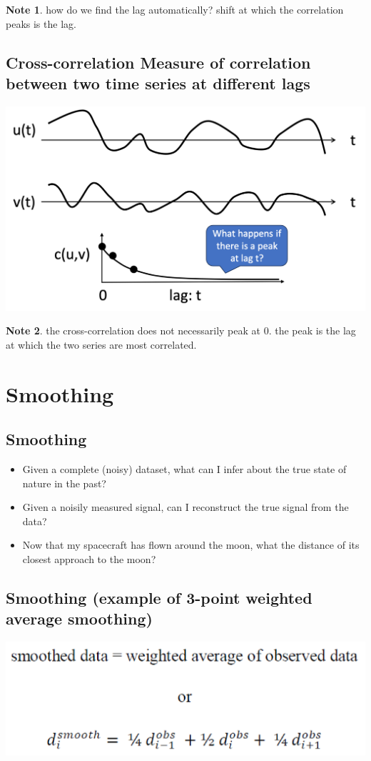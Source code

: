 \documentclass[11pt]{article}
\theoremstyle{definition}
\newtheorem{note}{Note}
\begin{document}
\begin{note}
  how do we find the lag automatically? 
  shift at which the correlation peaks is the lag.
\end{note}

\subsection{Cross-correlation
Measure of correlation between two time series
at different lags}
\includegraphics[width=\textwidth/2]{13.png}

\begin{note}
  the cross-correlation does not necessarily peak at 0. the peak is the lag at which the two series are most correlated.
\end{note}

\section{Smoothing}
\subsection{Smoothing}
\begin{itemize}
  \item Given a complete (noisy) dataset, what can I infer about the
  true state of nature in the past?
  \item Given a noisily measured signal, can I reconstruct the true
  signal from the data?
  \item Now that my spacecraft has flown around the moon, what the
  distance of its closest approach to the moon?
\end{itemize}

\subsection{Smoothing
(example of 3-point weighted average smoothing)}
\includegraphics[width = \textwidth/2]{14.png}
\end{document}
